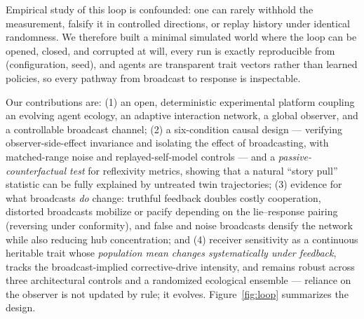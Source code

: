 \documentclass{svproc}
\begin{document}
Empirical study of this loop is confounded: one can rarely withhold the
measurement, falsify it in controlled directions, or replay
history under identical randomness. We therefore built a minimal simulated
world where the loop can be opened, closed, and corrupted at will, every
run is exactly reproducible from (configuration, seed), and agents are
transparent trait vectors rather than learned policies, so every pathway
from broadcast to response is inspectable.

Our contributions are: (1) an open, deterministic experimental platform
coupling an evolving agent ecology, an adaptive interaction network, a global
observer, and a controllable broadcast channel; (2) a six-condition causal
design --- verifying observer-side-effect invariance and isolating the effect
of broadcasting, with matched-range noise and replayed-self-model
controls --- and a \emph{passive-counterfactual test} for reflexivity
metrics, showing that a natural ``story pull'' statistic can be fully
explained by untreated twin trajectories; (3) evidence for what broadcasts \emph{do}
change: truthful feedback doubles costly cooperation, distorted broadcasts
mobilize or pacify depending on the lie--response pairing (reversing under
conformity), and false and noise broadcasts densify the network while also
reducing hub concentration; and (4) receiver sensitivity as a continuous
heritable trait whose \emph{population mean changes systematically under
feedback}, tracks the broadcast-implied corrective-drive intensity, and
remains robust across three architectural controls and a randomized
ecological ensemble ---
reliance on the observer is not updated by rule; it evolves. Figure~\ref{fig:loop} summarizes the design.
\end{document}
